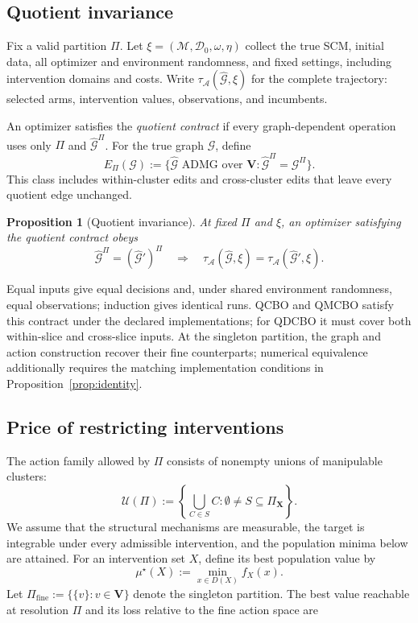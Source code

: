 \documentclass[twoside]{article}
\newtheorem{proposition}{Proposition}
\newcommand{\Gg}{\mathcal{G}}
\begin{document}
\subsection{Quotient invariance}
\label{sec:invariance}

Fix a valid partition $\Pi$. Let
$\xi=(\mathcal M,\mathcal D_0,\omega,\eta)$ collect the true SCM,
initial data, all optimizer and environment randomness, and fixed
settings, including intervention domains and costs. Write
$\tau_{\mathcal A}(\widehat{\Gg},\xi)$ for the complete trajectory:
selected arms, intervention values, observations, and incumbents.

An optimizer satisfies the \emph{quotient contract} if every
graph-dependent operation uses only $\Pi$ and
$\widehat{\Gg}^{\Pi}$. For the true graph $\Gg$, define
\begin{equation}
E_\Pi(\Gg):=
\{\widehat{\Gg}\text{ ADMG over }\mathbf V:
\widehat{\Gg}^{\Pi}=\Gg^{\Pi}\}.
\label{eq:protected-class}
\end{equation}
This class includes within-cluster edits and cross-cluster edits
that leave every quotient edge unchanged.

\begin{proposition}[Quotient invariance]
\label{prop:contract}
At fixed $\Pi$ and $\xi$, an optimizer satisfying the quotient
contract obeys
\[
\widehat{\Gg}^{\Pi}=(\widehat{\Gg}')^{\Pi}
\quad\Longrightarrow\quad
\tau_{\mathcal A}(\widehat{\Gg},\xi)
=\tau_{\mathcal A}(\widehat{\Gg}',\xi).
\]
\end{proposition}

Equal inputs give equal decisions and, under shared environment
randomness, equal observations; induction gives identical runs.
QCBO and QMCBO satisfy this contract under the declared implementations; for QDCBO it must cover both within-slice and cross-slice inputs. At the singleton partition, the graph and action construction recover their fine counterparts; numerical equivalence additionally requires the matching implementation conditions in Proposition~\ref{prop:identity}.

\subsection{Price of restricting interventions}
\label{sec:price}

The action family allowed by \(\Pi\) consists of nonempty unions of manipulable clusters:
\begin{equation}
 \mathcal U(\Pi):=
 \left\{\bigcup_{C\in S}C:
 \emptyset\ne S\subseteq\Pi_{\mathbf X}\right\}.
 \label{eq:cluster-actions}
\end{equation}
We assume that the structural mechanisms are measurable, the target
is integrable under every admissible intervention, and the population
minima below are attained. For an intervention set \(X\), define its
best population value by
\[
 \mu^\star(X):=\min_{x\in D(X)}f_X(x).
\]
Let \(\Pi_{\mathrm{fine}}:=\{\{v\}:v\in\mathbf V\}\) denote the singleton partition. The best value reachable at resolution \(\Pi\) and its loss relative to the fine action space are
\end{document}
